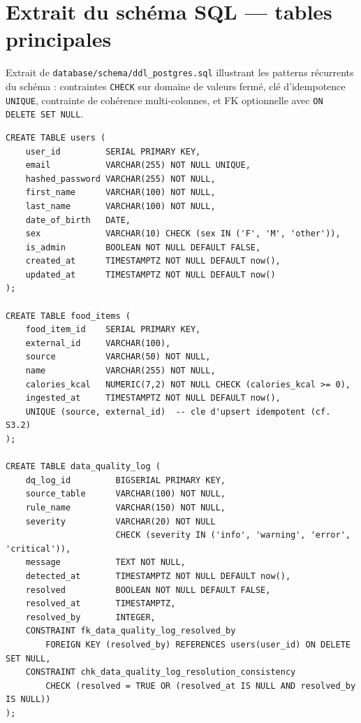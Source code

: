 \documentclass{article}
\begin{document}
\appendix
\section{Extrait du schéma SQL — tables principales}

Extrait de \texttt{database/schema/ddl\_postgres.sql} illustrant les patterns récurrents du schéma : contraintes \texttt{CHECK} sur domaine de valeurs fermé, clé d'idempotence \texttt{UNIQUE}, contrainte de cohérence multi-colonnes, et FK optionnelle avec \texttt{ON DELETE SET NULL}.

\begin{lstlisting}[style=sql]
CREATE TABLE users (
    user_id         SERIAL PRIMARY KEY,
    email           VARCHAR(255) NOT NULL UNIQUE,
    hashed_password VARCHAR(255) NOT NULL,
    first_name      VARCHAR(100) NOT NULL,
    last_name       VARCHAR(100) NOT NULL,
    date_of_birth   DATE,
    sex             VARCHAR(10) CHECK (sex IN ('F', 'M', 'other')),
    is_admin        BOOLEAN NOT NULL DEFAULT FALSE,
    created_at      TIMESTAMPTZ NOT NULL DEFAULT now(),
    updated_at      TIMESTAMPTZ NOT NULL DEFAULT now()
);

CREATE TABLE food_items (
    food_item_id    SERIAL PRIMARY KEY,
    external_id     VARCHAR(100),
    source          VARCHAR(50) NOT NULL,
    name            VARCHAR(255) NOT NULL,
    calories_kcal   NUMERIC(7,2) NOT NULL CHECK (calories_kcal >= 0),
    ingested_at     TIMESTAMPTZ NOT NULL DEFAULT now(),
    UNIQUE (source, external_id)  -- cle d'upsert idempotent (cf. S3.2)
);

CREATE TABLE data_quality_log (
    dq_log_id         BIGSERIAL PRIMARY KEY,
    source_table      VARCHAR(100) NOT NULL,
    rule_name         VARCHAR(150) NOT NULL,
    severity          VARCHAR(20) NOT NULL
                      CHECK (severity IN ('info', 'warning', 'error', 'critical')),
    message           TEXT NOT NULL,
    detected_at       TIMESTAMPTZ NOT NULL DEFAULT now(),
    resolved          BOOLEAN NOT NULL DEFAULT FALSE,
    resolved_at       TIMESTAMPTZ,
    resolved_by       INTEGER,
    CONSTRAINT fk_data_quality_log_resolved_by
        FOREIGN KEY (resolved_by) REFERENCES users(user_id) ON DELETE SET NULL,
    CONSTRAINT chk_data_quality_log_resolution_consistency
        CHECK (resolved = TRUE OR (resolved_at IS NULL AND resolved_by IS NULL))
);
\end{lstlisting}
\end{document}
